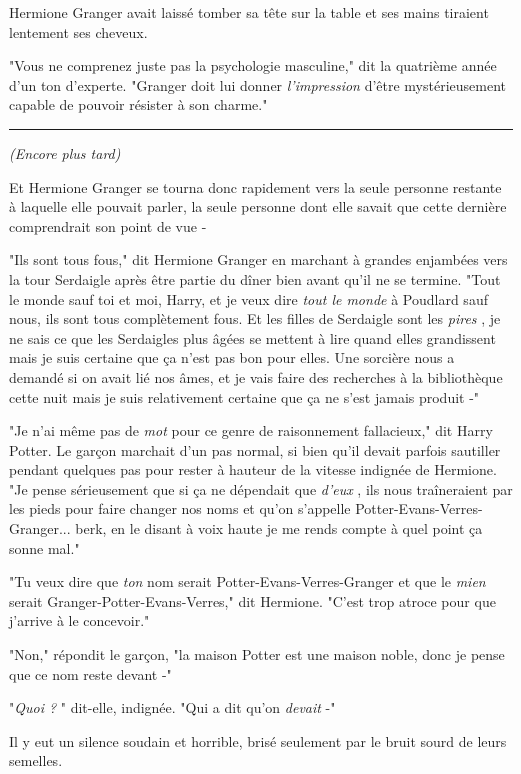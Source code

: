 Hermione Granger avait laissé tomber sa tête sur la table et ses mains tiraient lentement ses cheveux.

"Vous ne comprenez juste pas la psychologie masculine," dit la quatrième année d'un ton d'experte. "Granger doit lui donner \emph{l'impression}  d'être mystérieusement capable de pouvoir résister à son charme."
\par\noindent\rule{\textwidth}{0.4pt}
\emph{(Encore plus tard)} 

Et Hermione Granger se tourna donc rapidement vers la seule personne restante à laquelle elle pouvait parler, la seule personne dont elle savait que cette dernière comprendrait son point de vue -

"Ils sont tous fous," dit Hermione Granger en marchant à grandes enjambées vers la tour Serdaigle après être partie du dîner bien avant qu'il ne se termine. "Tout le monde sauf toi et moi, Harry, et je veux dire \emph{tout le monde}  à Poudlard sauf nous, ils sont tous complètement fous. Et les filles de Serdaigle sont les \emph{pires} , je ne sais ce que les Serdaigles plus âgées se mettent à lire quand elles grandissent mais je suis certaine que ça n'est pas bon pour elles. Une sorcière nous a demandé si on avait lié nos âmes, et je vais faire des recherches à la bibliothèque cette nuit mais je suis relativement certaine que ça ne s'est jamais produit -"

"Je n'ai même pas de \emph{mot}  pour ce genre de raisonnement fallacieux," dit Harry Potter. Le garçon marchait d'un pas normal, si bien qu'il devait parfois sautiller pendant quelques pas pour rester à hauteur de la vitesse indignée de Hermione. "Je pense sérieusement que si ça ne dépendait que \emph{d'eux} , ils nous traîneraient par les pieds pour faire changer nos noms et qu'on s'appelle Potter-Evans-Verres-Granger... berk, en le disant à voix haute je me rends compte à quel point ça sonne mal."

"Tu veux dire que \emph{ton}  nom serait Potter-Evans-Verres-Granger et que le \emph{mien } serait Granger-Potter-Evans-Verres," dit Hermione. "C'est trop atroce pour que j'arrive à le concevoir."

"Non," répondit le garçon, "la maison Potter est une maison noble, donc je pense que ce nom reste devant -"

"\emph{Quoi ?} " dit-elle, indignée. "Qui a dit qu'on \emph{devait}  -"

Il y eut un silence soudain et horrible, brisé seulement par le bruit sourd de leurs semelles.


